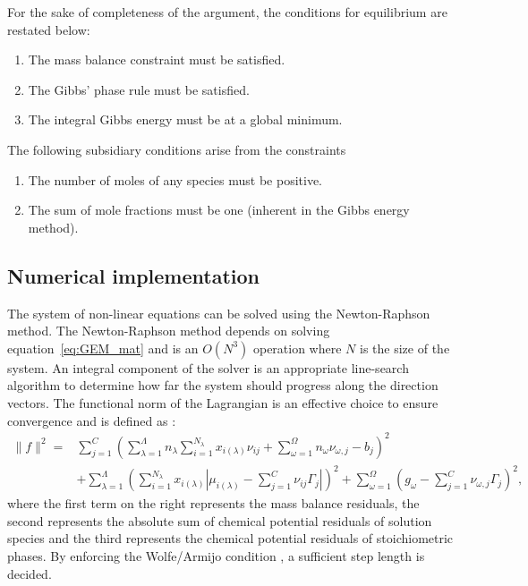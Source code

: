 	For the sake of completeness of the argument, the conditions for equilibrium are restated below:
	\begin{enumerate}\compresslist
		\item The mass balance constraint must be satisfied.
		\item The Gibbs' phase rule must be satisfied.
		\item The integral Gibbs energy must be at a global minimum.
	\end{enumerate}

	The following subsidiary conditions arise from the constraints
	\begin{enumerate}[label=\Alph*.]\compresslist
		\item The number of moles of any species must be positive.
		\item The sum of mole fractions must be one (inherent in the Gibbs energy method).
	\end{enumerate}
	
	\subsection{Numerical implementation}
	The system of non-linear equations can be solved using the Newton-Raphson method. The Newton-Raphson method depends on solving equation~\eqref{eq:GEM_mat} and is an $\mathit{O}(N^3)$ operation where $N$ is the size of the system. 
	An integral component of the solver is an appropriate line-search algorithm to determine how far the system should progress along the direction vectors. The functional norm of the Lagrangian is an effective choice to ensure convergence and is defined as \cite{Piro17}:
	\begin{equation}
	\begin{aligned}
		\|f\|^2 = &\sum_{j=1}^{C}\left(\sum_{\lambda=1}^{\Lambda} n_\lambda \sum_{i=1}^{N_\lambda} x_{i(\lambda)}\nu_{ij} + \sum_{\omega=1}^{\Omega}n_{\omega}\nu_{\omega,j} - b_j\right)^2 \\
		&+ \sum_{\lambda=1}^{\Lambda} \left(\sum_{i=1}^{N_\lambda} x_{i(\lambda)}\left\vert\mu_{i(\lambda)} - \sum_{j=1}^{C}\nu_{ij} \Gamma_j \right\vert \right)^2 + \sum_{\omega=1}^{\Omega}\left(g_\omega - \sum_{j=1}^{C}\nu_{\omega,j} \Gamma_j \right)^2,
		\end{aligned}
	\end{equation}
	where the first term on the right represents the mass balance residuals, the second represents the absolute sum of chemical potential residuals of solution species and the third represents the chemical potential residuals of stoichiometric phases. By enforcing the Wolfe/Armijo condition \cite{Nocedal06}, a sufficient step length is decided.

